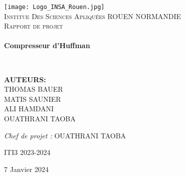 \begin{titlepage}
  \begin{center}

    \texttt{[image: Logo\_INSA\_Rouen.jpg]}~\\[1.5cm]

    \textsc{\LARGE Institue Des Sciences Apliquées ROUEN NORMANDIE}\\[2cm]

    \textsc{\Large Rapport de projet}\\[2cm]

   \HRule \\[0.4cm]
    { \huge \bfseries Compresseur d'Huffman\\[0.4cm] }

    \HRule \\[2cm]
    
   

    \begin{minipage}{0.4\textwidth}
      \begin{flushleft} \large
       \textbf{AUTEURS:}\\
   \textsc{THOMAS BAUER\\
    MATIS SAUNIER\\
    ALI HAMDANI\\
    OUATHRANI TAOBA}\\
      
       
      \end{flushleft}
    \end{minipage}
    \begin{minipage}{0.4\textwidth}
      \begin{flushright} \large
        \emph{Chef de projet : } OUATHRANI TAOBA 
      \end{flushright}
    \end{minipage}
  
\begin{minipage}[b]{0.2\textwidth}
        ITI3 2023-2024
    \end{minipage}
    
    \vfill
 
 {\large 7 Janvier 2024}


  \end{center}
\end{titlepage}



    